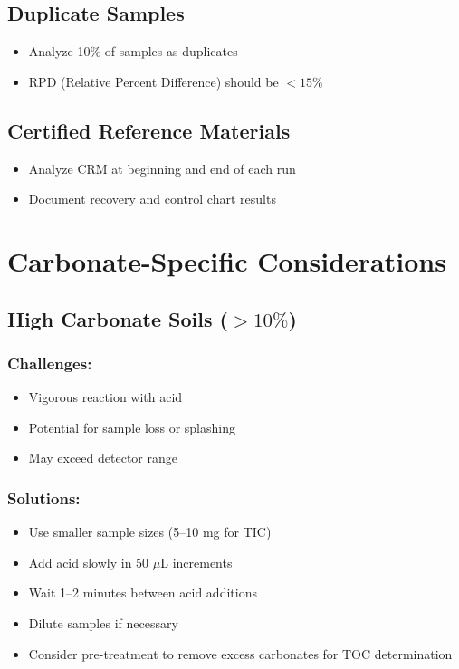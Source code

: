 \documentclass[11pt,a4paper]{article}\usepackage[]{graphicx}\usepackage[]{xcolor}
\begin{document}
\subsection{Duplicate Samples}
\begin{itemize}[noitemsep]
    \item Analyze 10\% of samples as duplicates
    \item RPD (Relative Percent Difference) should be $<15\%$
\end{itemize}

\subsection{Certified Reference Materials}
\begin{itemize}[noitemsep]
    \item Analyze CRM at beginning and end of each run
    \item Document recovery and control chart results
\end{itemize}

\section{Carbonate-Specific Considerations}

\subsection{High Carbonate Soils ($>10\%$)}

\subsubsection{Challenges:}
\begin{itemize}[noitemsep]
    \item Vigorous reaction with acid
    \item Potential for sample loss or splashing
    \item May exceed detector range
\end{itemize}

\subsubsection{Solutions:}
\begin{itemize}[noitemsep]
    \item Use smaller sample sizes (5--10 mg for TIC)
    \item Add acid slowly in 50 $\mu$L increments
    \item Wait 1--2 minutes between acid additions
    \item Dilute samples if necessary
    \item Consider pre-treatment to remove excess carbonates for TOC determination
\end{itemize}
\end{document}
